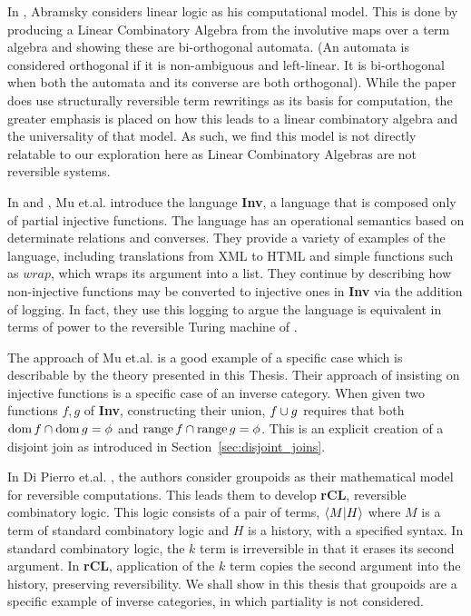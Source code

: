 In \cite{abramsky05:reversible}, Abramsky considers linear logic as his computational model. This is
done by producing a Linear Combinatory Algebra \cite{abramsky02:GOI} from the involutive maps over a
term algebra and showing these are bi-orthogonal automata. (An automata is considered orthogonal if
it is non-ambiguous and left-linear. It is bi-orthogonal when both the automata and its converse are
both orthogonal). While the paper does use structurally reversible term rewritings as its
basis for computation, the greater emphasis is placed on how this leads to a linear combinatory
algebra and the universality of that model. As such, we find this model is not directly relatable to
our exploration here as Linear Combinatory Algebras are not reversible systems.

In \cite{mu06bidirectional} and \cite{muetal04:injreversible}, Mu et.al. introduce the language
\textbf{Inv}, a language that is composed only of partial injective functions. The language has an
operational semantics based on determinate relations and converses. They provide a variety of examples of the
language, including translations from XML to HTML and simple functions such as $wrap$, which wraps
its argument into a list. They continue by describing how non-injective functions may be converted to
injective ones in \textbf{Inv} via the addition of logging. In fact, they use this logging to argue
the language is equivalent in terms of power to the reversible Turing machine of
\cite{bennett:1973reverse}.

The approach of Mu et.al. is a good example of a specific case which is describable by the theory
presented in this Thesis. Their approach of insisting on injective functions is a specific case of
an inverse category. When given two functions $f,g$ of \textbf{Inv}, constructing their union,
$f\cup g$ requires that both $\operatorname*{dom} f \cap \operatorname*{dom} g = \phi$ and $\operatorname*{range} f \cap \operatorname*{range} g =
\phi$. This is an explicit creation of a disjoint join as introduced in
Section~\ref{sec:disjoint_joins}.

In Di Pierro et.al. \cite{DiPierro200625}, the authors consider groupoids as their mathematical
model for reversible computations. This leads them to develop \textbf{rCL}, reversible combinatory
logic. This logic consists of a pair of terms, $\langle M|H\rangle$ where $M$ is a term of standard combinatory
logic and $H$ is a history, with a specified syntax. In standard combinatory logic, the $k$ term is
irreversible in that it erases its second argument. In \textbf{rCL}, application of the $k$ term
copies the second argument into the history, preserving reversibility. We shall show in this thesis
that groupoids are a specific example of inverse categories, in which partiality is not considered.

